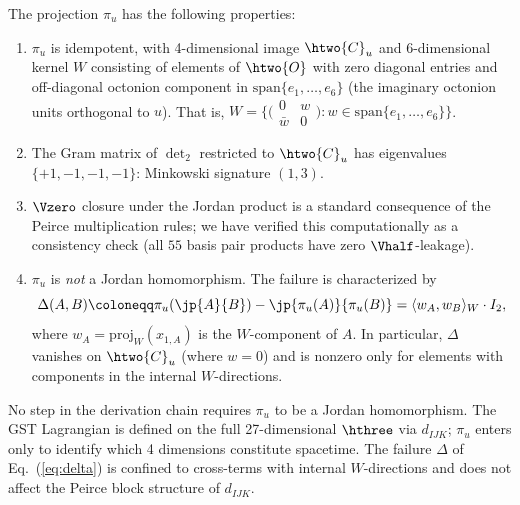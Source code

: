 \begin{proposition}
\label{prop:pi-u}
The projection $\pi_u$ has the following properties:
\begin{enumerate}[label=(\alph*)]
\item $\pi_u$ is idempotent, with 4-dimensional image
  $\htwo{C}_u$ and 6-dimensional kernel $W$ consisting of elements of
  $\htwo{O}$ with zero diagonal entries and off-diagonal octonion
  component in $\mathrm{span}\{e_1, \ldots, e_6\}$ (the imaginary
  octonion units orthogonal to $u$). That is,
  $W = \bigl\{\bigl(\begin{smallmatrix} 0 & w \\ \bar{w} & 0
  \end{smallmatrix}\bigr) : w \in \mathrm{span}\{e_1, \ldots, e_6\}
  \bigr\}$.

\item The Gram matrix of $\det_2$ restricted to $\htwo{C}_u$ has
  eigenvalues $\{+1, -1, -1, -1\}$: Minkowski signature $(1,3)$.

\item $\Vzero$ closure under the Jordan product is a standard
  consequence of the Peirce multiplication rules; we have verified
  this computationally as a consistency check (all $55$ basis pair
  products have zero $\Vhalf$-leakage).

\item $\pi_u$ is \emph{not} a Jordan homomorphism. The failure is
  characterized by
  \begin{equation}
  \label{eq:delta}
  \Delta(A, B) \coloneqq \pi_u(\jp{A}{B}) - \jp{\pi_u(A)}{\pi_u(B)}
  = \langle w_A, w_B \rangle_W \cdot I_2,
  \end{equation}
  where $w_A = \mathrm{proj}_W(x_{1,A})$ is the $W$-component of $A$.
  In particular, $\Delta$ vanishes on $\htwo{C}_u$ (where $w = 0$) and
  is nonzero only for elements with components in the internal
  $W$-directions.
\end{enumerate}
\end{proposition}

\begin{remark}
\label{rem:pi-u-non-hom}
No step in the derivation chain requires $\pi_u$ to be a Jordan
homomorphism. The GST Lagrangian is defined on the full 27-dimensional
$\hthree$ via $d_{IJK}$; $\pi_u$ enters only to identify which 4
dimensions constitute spacetime. The failure $\Delta$ of
Eq.~(\ref{eq:delta}) is confined to cross-terms with internal
$W$-directions and does not affect the Peirce block structure of
$d_{IJK}$.
\end{remark}

